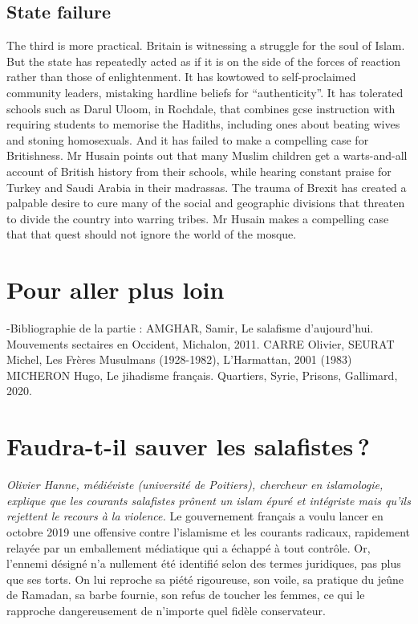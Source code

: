 \subsection{State failure}
The third is more practical. Britain is witnessing a struggle for the soul of Islam. But the state has repeatedly acted as if it is on the side of the forces of reaction rather than those of enlightenment. It has kowtowed to self-proclaimed community leaders, mistaking hardline beliefs for “authenticity”. It has tolerated schools such as Darul Uloom, in Rochdale, that combines gcse instruction with requiring students to memorise the Hadiths, including ones about beating wives and stoning homosexuals. And it has failed to make a compelling case for Britishness. Mr Husain points out that many Muslim children get a warts-and-all account of British history from their schools, while hearing constant praise for Turkey and Saudi Arabia in their madrassas. The trauma of Brexit has created a palpable desire to cure many of the social and geographic divisions that threaten to divide the country into warring tribes. Mr Husain makes a compelling case that that quest should not ignore the world of the mosque. 
\section{Pour aller plus loin}
-Bibliographie de la partie :
AMGHAR, Samir, Le salafisme d’aujourd’hui. Mouvements sectaires en Occident,
Michalon, 2011.
CARRE Olivier, SEURAT Michel, Les Frères Musulmans (1928-1982), L'Harmattan,
2001 (1983)
MICHERON Hugo, Le jihadisme français. Quartiers, Syrie, Prisons, Gallimard, 2020.





\section{Faudra-t-il sauver les salafistes ?}

\textit{Olivier Hanne, médiéviste (université de Poitiers), chercheur en islamologie, explique que les courants salafistes prônent un islam épuré et intégriste mais qu’ils rejettent le recours à la violence. }
Le gouvernement français a voulu lancer en octobre 2019 une offensive
contre l'islamisme et les courants radicaux, rapidement relayée par un
emballement médiatique qui a échappé à tout contrôle. Or, l'ennemi
désigné n'a nullement été identifié selon des termes juridiques, pas
plus que ses torts. On lui reproche sa piété rigoureuse, son voile, sa
pratique du jeûne de Ramadan, sa barbe fournie, son refus de toucher les
femmes, ce qui le rapproche dangereusement de n'importe quel fidèle
conservateur.

